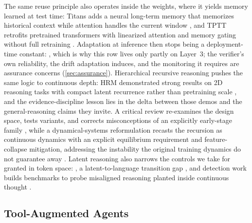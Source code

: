 The same reuse principle also operates inside the weights, where it yields memory learned at test time: Titans adds a neural long-term memory that memorizes historical context while attention handles the current window \cite{id250100663}, and TPTT retrofits pretrained transformers with linearized attention and memory gating without full retraining \cite{id250617671}. Adaptation at inference then stops being a deployment-time constant:  \cite{id250519475}, which is why this row lives only partly on Layer~3; the verifier's own reliability, the drift adaptation induces, and the monitoring it requires are assurance concerns (\cref{sec:assurance}). Hierarchical recursive reasoning pushes the same logic to continuous depth: HRM demonstrated strong results on 2D reasoning tasks with compact latent recurrence rather than pretraining scale \cite{id250621734}, and the evidence-discipline lesson lies in the delta between those demos and the general-reasoning claims they invite. A critical review re-examines the design space, tests variants, and corrects misconceptions of an explicitly early-stage family \cite{id251000355}, while a dynamical-systems reformulation recasts the recursion as continuous dynamics with an explicit equilibrium requirement and feature-collapse mitigation, addressing the instability the original training dynamics do not guarantee away \cite{id260322871}. Latent reasoning also narrows the controls we take for granted in token space: , a latent-to-language transition gap \cite{id260921662}, and detection work builds benchmarks to probe misaligned reasoning planted inside continuous thought \cite{id260423460}.

\subsection{Tool-Augmented Agents}
\label{sec:l3-agents}


